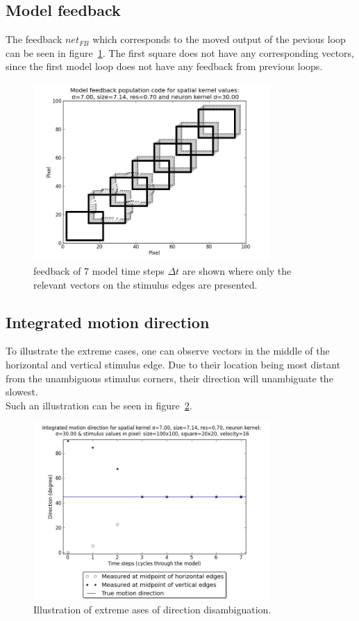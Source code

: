 \documentclass[a4paper]{article}
\begin{document}
\subsection{Model feedback}
The feedback $net_{FB}$ which corresponds to the moved output of the pevious loop can be seen in figure~\ref{fig:feedback}. The first square does not have any corresponding vectors, since the first model loop does not have any feedback from previous loops.
\vspace{0.5cm}
\begin{figure}[ht]
\centering
\includegraphics[width=9cm]{pics/feedback}
\caption{feedback of 7 model time steps $\Delta t$ are shown where only the relevant vectors on the stimulus edges are presented.}
\label{fig:feedback}
\end{figure}
\vspace{0.5cm}

\subsection{Integrated motion direction}

To illustrate the extreme cases, one can observe vectors in the middle of the horizontal and vertical stimulus edge. Due to their location being most distant from the unambiguous stimulus corners, their direction will unambiguate the slowest.\\
Such an illustration can be seen in figure~\ref{fig:integratedMotion}.

\vspace{0.5cm}
\begin{figure}[ht]
\centering
\includegraphics[width=9cm]{pics/integratedMotion}
\caption{Illustration of extreme ases of direction disambiguation.}
\label{fig:integratedMotion}
\end{figure}
\vspace{0.5cm}
\end{document}
